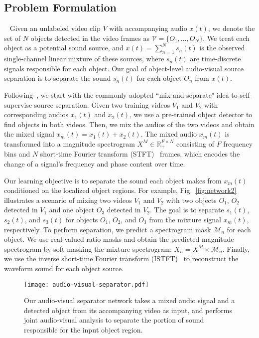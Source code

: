 \documentclass[10pt,twocolumn,letterpaper]{article}
\begin{document}
\subsection{Problem Formulation}~\label{sec:formulation}
Given an unlabeled video clip $V$ with accompanying audio $x(t)$, we denote the set of $N$ objects detected in the video frames as $\mathcal{V} = \{O_1,\ldots, O_N\}$. We treat each object as a potential sound source, and $x(t) = \sum_{n=1}^{N}s_n(t)$ is the observed single-channel linear mixture of these sources, where $s_n(t)$ are time-discrete signals responsible for each object. Our goal of object-level audio-visual source separation is to separate the sound $s_n(t)$ for each object $O_n$ from $x(t)$.

Following~\cite{huang2015joint,hershey2016deep,yu2017permutation,zhao2018sound,owens2018audio,gao2019visualsound,ephrat2018looking}, we start with the commonly adopted ``mix-and-separate" idea to self-supervise source separation. Given two training videos $V_1$ and $V_2$ with corresponding audios $x_1(t)$ and $x_2(t)$, we use a pre-trained object detector to find objects in both videos. Then, we mix the audios of the two videos and obtain the mixed signal $x_m(t) = x_1(t) + x_2(t)$. The mixed audio $x_m(t)$ is transformed into a magnitude spectrogram $X^M \in \mathbb{R}_{+}^{F \times N}$ consisting of $F$ frequency bins and $N$ short-time Fourier transform (STFT)~\cite{griffin1984signal} frames, which encodes the change of a signal's frequency and phase content over time.

Our learning objective is to separate the sound each object makes from $x_m(t)$ conditioned on the localized object regions. For example, Fig.~\ref{fig:network2} illustrates a scenario of mixing two videos $V_1$ and $V_2$ with two objects $O_1$, $O_2$ detected in $V_1$ and one object $O_3$ detected in $V_2$. The goal is to separate $s_1(t)$, $s_2(t)$, and $s_3(t)$ for objects $O_1$, $O_2$, and $O_3$ from the mixture signal $x_m(t)$, respectively. To perform separation, we predict a spectrogram mask $\mathcal{M}_n$ for each object. We use real-valued ratio masks and obtain the predicted magnitude spectrogram by soft masking the mixture spectrogram: $X_n = X^M \times \mathcal{M}_n$. Finally, we use the inverse short-time Fourier transform (ISTFT)~\cite{griffin1984signal} to reconstruct the waveform sound for each object source.


\begin{figure}
    \center
    \texttt{[image: audio-visual-separator.pdf]}
    \caption{Our audio-visual separator network takes a mixed audio signal and a detected object from its accompanying video as input, and performs joint audio-visual analysis to separate the portion of sound responsible for the input object region.}
    \label{fig:network1}
    \vspace*{-0.1in}
\end{figure}
\end{document}
